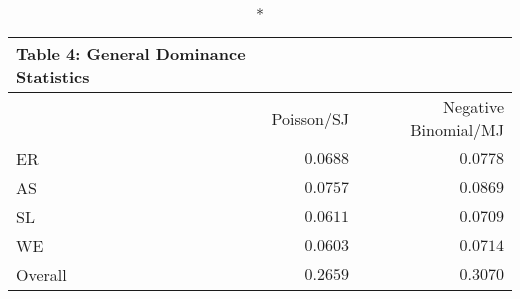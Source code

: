 \begin{longtable}{l|rr}
\caption*{
{\large Table 4: General Dominance Statistics}
} \\ 
\toprule
\multicolumn{1}{l}{} & Poisson/SJ & Negative Binomial/MJ \\ 
\midrule
ER & $0.0688$ & $0.0778$ \\ 
AS & $0.0757$ & $0.0869$ \\ 
SL & $0.0611$ & $0.0709$ \\ 
WE & $0.0603$ & $0.0714$ \\ 
Overall & $0.2659$ & $0.3070$ \\ 
\bottomrule
\end{longtable}

